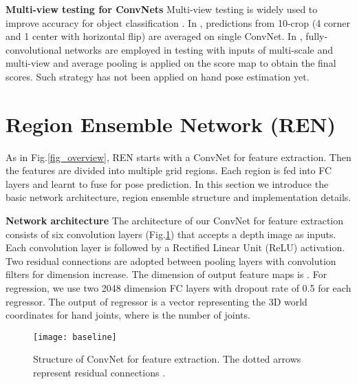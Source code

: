 \documentclass{article}
\begin{document}
\noindent\textbf{Multi-view testing for ConvNets}\hspace{2mm}
Multi-view testing is widely used to improve accuracy for object classification \cite{krizhevsky2012imagenet}. In \cite{krizhevsky2012imagenet}, predictions from 10-crop (4 corner and 1 center with horizontal flip) are averaged on single ConvNet. In \cite{sermanet2013overfeat}, fully-convolutional networks are employed in testing with inputs of multi-scale and multi-view and average pooling is applied on the score map to obtain the final scores. Such strategy has not been applied on hand pose estimation yet.

\section{Region Ensemble Network (REN)}
As in Fig.\ref{fig_overview}, REN starts with a ConvNet for feature extraction. Then the features are divided into multiple grid regions. Each region is fed into FC layers and learnt to fuse for pose prediction. In this section we introduce the basic network architecture, region ensemble structure and implementation details.

\noindent\textbf{Network architecture}\hspace{2mm} The architecture of our ConvNet for feature extraction consists of six  convolution layers (Fig.\ref{fig_baseline}) that accepts a  depth image as inputs. Each convolution layer is followed by a Rectified Linear Unit (ReLU) activation. Two residual connections \cite{he2015deep} are adopted between pooling layers with  convolution filters for dimension increase. The dimension of output feature maps is . For regression, we use two 2048 dimension FC layers with dropout rate of 0.5 for each regressor. The output of regressor is a  vector representing the 3D world coordinates for hand joints, where  is the number of joints.

\begin{figure}[htb]
\centering
{\texttt{[image: baseline]}}
\caption{Structure of ConvNet for feature extraction. The dotted arrows represent residual connections \cite{he2015deep}.}
\label{fig_baseline}
\end{figure}
\end{document}
